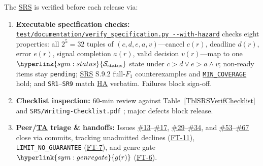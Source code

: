 \documentclass[12pt, titlepage]{article}
\newcommand{\MinCoverage}{\hyperref[const:MIN_COVERAGE]{\texttt{MIN\_\allowbreak{}COVERAGE}}}
\newcommand{\SymStatus}{\hyperlink{sym:status}{\mathcal{S}_{\text{status}}}}
\newcommand{\SymGenreGate}{\hyperlink{sym:genregate}{g(r)}}
\newcommand{\HA}{\hyperlink{vnv-acr-ha}{HA}}
\newcommand{\SRS}{\hyperlink{vnv-acr-srs}{SRS}}
\newcommand{\TA}{\hyperlink{vnv-acr-ta}{TA}}
\begin{document}
The \SRS{} \cite{VeritySRS2026} is verified before each release via:
\begin{enumerate}[leftmargin=*, itemsep=0.5pt, topsep=2pt]
    \item \textbf{Executable specification checks:} \href{https://github.com/richy1337/Verity/blob/main/test/documentation/verify_specification.py}{\texttt{test/\allowbreak{}documentation/\allowbreak{}verify\_\allowbreak{}specification.py -{}-with-hazard}} checks eight properties: all $2^5 = 32$ tuples of $(c, d, e, a, v)$---cancel $c(r)$, deadline $d(r)$, error $e(r)$, signal completion $a(r)$, valid decision $v(r)$---map to one $\SymStatus$ state under $c > d \lor e > a \land v$; non-ready items stay \texttt{pending}; \SRS{} S.9.2 full-$F_1$ counterexamples and \MinCoverage{} hold; and \texttt{SR1}--\texttt{SR9} match \HA{} verbatim. Failures block sign-off.
    \item \textbf{Checklist inspection:} 60-min review against Table~\ref{TblSRSVerifChecklist} and \texttt{SRS/\allowbreak{}Writing-\allowbreak{}Checklist.pdf} \cite{SmithCapTemplate}; major defects block release.
    \item \textbf{Peer/\TA{} triage \& handoffs:} Issues \href{https://github.com/richy1337/Verity/issues/13}{\#13}--\href{https://github.com/richy1337/Verity/issues/17}{\#17}, \href{https://github.com/richy1337/Verity/issues/29}{\#29}--\href{https://github.com/richy1337/Verity/issues/34}{\#34}, and \href{https://github.com/richy1337/Verity/issues/53}{\#53}--\href{https://github.com/richy1337/Verity/issues/67}{\#67} close via commits, tracking unadmitted declines (\hyperref[test:FT-11]{FT-11}), \texttt{LIMIT\_\allowbreak{}NO\_\allowbreak{}GUARANTEE} (\hyperref[test:FT-7]{FT-7}), and genre gate $\SymGenreGate$ (\hyperref[test:FT-6]{FT-6}).
\end{enumerate}
\end{document}
